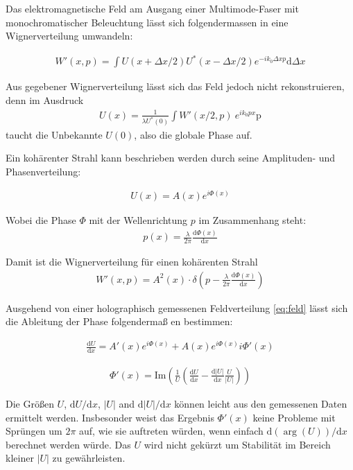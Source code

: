 \documentclass{article}
\newcommand{\trmd}{\textrm{d}}
\begin{document}
Das elektromagnetische Feld am Ausgang einer Multimode-Faser mit
monochromatischer Beleuchtung l\"asst sich folgendermassen in eine
Wignerverteilung umwandeln:

\begin{align}
  W'(x,p) = \int U(x+\Delta x/2) U^*(x-\Delta x/2) e^{-i k_0 \Delta x p}\textrm{d}\Delta x
\end{align}

Aus gegebener Wignerverteilung l\"asst sich das Feld jedoch nicht
rekonstruieren, denn im Ausdruck
\begin{align}
  U(x) = \frac{1}{\lambda U^*(0)} \int W'(x/2,p)\ e^{ik_0 px} \textrm{p}
\end{align}
taucht die Unbekannte $U(0)$, also die globale Phase auf.

Ein koh\"arenter Strahl kann beschrieben werden durch seine
Amplituden- und Phasenverteilung:

\begin{align}
  \label{eq:feld}
  U(x) = A(x) e^{i\Phi(x)}
\end{align}

Wobei die Phase $\Phi$ mit der Wellenrichtung $p$ im Zusammenhang steht:
\begin{align}
  p(x) = \frac{\lambda}{2\pi} \frac{\textrm{d} \Phi(x)}{\textrm{d} x}
\end{align}

Damit ist die Wignerverteilung f\"ur einen koh\"arenten Strahl
\begin{align}
  W'(x,p)= A^2(x) \cdot \delta\left(p-\frac{\lambda}{2\pi}
    \frac{\textrm{d} \Phi(x)}{\textrm{d} x}\right)
\end{align}

Ausgehend von einer holographisch gemessenen Feldverteilung
\eqref{eq:feld} l\"asst sich die Ableitung der Phase folgenderma\ss
en bestimmen:

\begin{align}
  \frac{\trmd U}{\trmd x} = A'(x) e^{i\Phi(x)} + A(x) e^{i\Phi(x)} i \Phi'(x)
\end{align}

\begin{align}
  \Phi'(x) = \textrm{Im}\left(\frac{1}{U}\left(\frac{\trmd U}{\trmd x} -  \frac{\trmd |U|}{\trmd x} \frac{U}{| U |}\right)\right) 
\end{align}

Die Gr\"o\ss en $U$, $\trmd U / \trmd x$, $|U|$ and $\trmd |U| / \trmd
x$ k\"onnen leicht aus den gemessenen Daten ermittelt
werden. Insbesonder weist das Ergebnis $\Phi'(x)$ keine Probleme mit
Spr\"ungen um $2\pi$ auf, wie sie auftreten w\"urden, wenn einfach
$\trmd(\arg(U))/\trmd x$ berechnet werden w\"urde. Das $U$ wird nicht
gek\"urzt um Stabilit\"at im Bereich kleiner $|U|$ zu gew\"ahrleisten.
\end{document}
